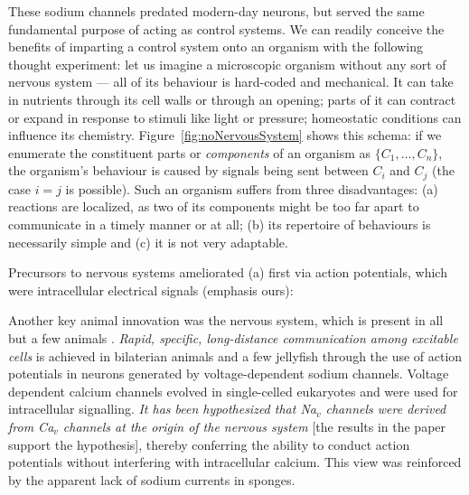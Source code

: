 These sodium channels predated modern-day neurons, but served the same fundamental purpose of acting as control systems. We can readily conceive the benefits of imparting a control system onto an organism with the following thought experiment: let us imagine a microscopic organism without any sort of nervous system --- all of its behaviour is hard-coded and mechanical. It can take in nutrients through its cell walls or through an opening; parts of it can contract or expand in response to stimuli like light or pressure; homeostatic conditions can influence its chemistry. Figure~\ref{fig:noNervousSystem} shows this schema: if we enumerate the constituent parts or {\em components} of an organism as $\{C_1,\dots,C_n\}$, the organism's behaviour is caused by signals being sent between $C_i$ and $C_j$ (the case $i=j$ is possible). Such an organism suffers from three disadvantages: (a) reactions are localized, as two of its components might be too far apart to communicate in a timely manner or at all; (b) its repertoire of behaviours is necessarily simple and (c) it is not very adaptable.

Precursors to nervous systems ameliorated (a) first via action potentials, which were intracellular electrical signals \cite{Liebeskind31052011} (emphasis ours):
\begin{emquote}
Another key animal innovation was the nervous system, which is present in all but a few animals . {\em Rapid, specific, long-distance communication among excitable cells} is achieved in bilaterian animals and a few jellyfish  through the use of action potentials  in neurons generated by voltage-dependent sodium  channels. Voltage dependent calcium  channels evolved in single-celled eukaryotes and were used for intracellular signalling. {\em It has been hypothesized that Na$_v$ channels were derived from Ca$_v$ channels at the origin of the nervous system} \textsf{[the results in the paper support the hypothesis]}, thereby conferring the ability to conduct action potentials without interfering with intracellular calcium. This view was reinforced by the apparent lack of sodium currents in sponges.
\end{emquote}

